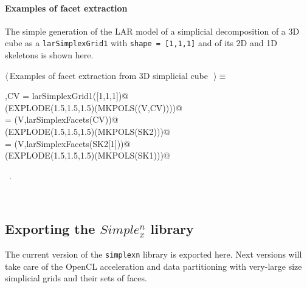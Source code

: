 \documentclass[11pt,oneside]{article}	%
\begin{document}
\paragraph{Examples of facet extraction}
The simple generation of the LAR model of a simplicial decomposition of a 3D cube as a \texttt{larSimplexGrid1} with \texttt{shape = [1,1,1]} and of its 2D and 1D skeletons is shown here.

\begin{flushleft} \small
\begin{minipage}{\linewidth} \label{scrap9}
$\langle\,$Examples of facet extraction from 3D simplicial cube\nobreak\ {\footnotesize {}}$\,\rangle\equiv$
\vspace{-1ex}
\begin{list}{}{} \item
\mbox{}\verb@V,CV = larSimplexGrid1([1,1,1])@\\
\mbox{}\verb@VIEW(EXPLODE(1.5,1.5,1.5)(MKPOLS((V,CV))))@\\
\mbox{} = (V,larSimplexFacets(CV))@\\
\mbox{}\verb@VIEW(EXPLODE(1.5,1.5,1.5)(MKPOLS(SK2)))@\\
\mbox{} = (V,larSimplexFacets(SK2[1]))@\\
\mbox{}\verb@VIEW(EXPLODE(1.5,1.5,1.5)(MKPOLS(SK1)))@\\
\mbox{}\verb@@{\NWsep}
\end{list}
\vspace{-1ex}
\footnotesize\addtolength{\baselineskip}{-1ex}
\begin{list}{}{\setlength{\itemsep}{-\parsep}\setlength{\itemindent}{-\leftmargin}}
\item \NWtxtMacroRefIn\ .
\end{list}
\end{minipage}\\[4ex]
\end{flushleft}



\subsection{Exporting the $Simple_x^n$ library}
The current version of the \texttt{simplexn} library is exported here. Next versions will take care of the OpenCL acceleration and data partitioning with very-large size simplicial grids and their sets of faces.
\end{document}
